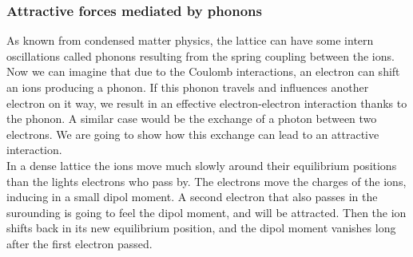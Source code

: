 \documentclass[../main.tex]{subfile}
\begin{document}
\subsubsection{Attractive forces mediated by phonons}
As known from condensed matter physics, the lattice can have some intern oscillations called phonons resulting from the spring coupling between the ions.
Now we can imagine that due to the Coulomb interactions, an electron can shift an ions producing a phonon. If this phonon travels and influences another electron
on it way, we result in an effective electron-electron interaction thanks to the phonon. A similar case would be the exchange of a photon between two electrons.
We are going to show how this exchange can lead to an attractive interaction.\\

In a dense lattice the ions move much slowly around their equilibrium positions than the lights electrons who pass by. The electrons move the charges of the ions, inducing
in a small dipol moment. A second electron that also passes in the surounding is going to feel the dipol moment, and will be 
attracted. Then the ion shifts back in its new equilibrium position, and the dipol moment vanishes long after the first electron passed.\\
\end{document}
